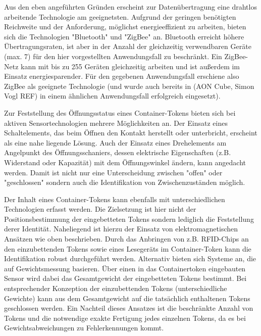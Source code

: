 Aus den eben angeführten Gründen erscheint zur Datenübertragung eine drahtlos arbeitende Technologie am geeignetsten. Aufgrund der geringen benötigten Reichweite und der Anforderung, möglichst energieeffizient zu arbeiten, bieten sich die Technologien "Bluetooth" und "ZigBee" an. Bluetooth erreicht höhere Übertragungsraten, ist aber in der Anzahl der gleichzeitig verwendbaren Geräte (max. 7) für den hier vorgestellten Anwendungsfall zu beschränkt. Ein ZigBee-Netz kann mit bis zu 255 Geräten gleichzeitig arbeiten und ist außerdem im Einsatz energiesparender. Für den gegebenen Anwendungsfall erschiene also ZigBee als geeignete Technologie (und wurde auch bereits in (AON Cube, Simon Vogl REF) in einem ähnlichen Anwendungsfall erfolgreich eingesetzt).

Zur Feststellung des Öffnungsstatus eines Container-Tokens bieten sich bei aktiven Sensortechnologien mehrere Möglichkeiten an. Der Einsatz eines Schaltelements, das beim Öffnen den Kontakt herstellt oder unterbricht, erscheint als eine nahe liegende Lösung. Auch der Einsatz eines Drehelements am Angelpunkt des Öffnungsschaniers, dessen elektrische Eigenschaften (z.B. Widerstand oder Kapazität) mit dem Öffnungswinkel ändern, kann angedacht werden. Damit ist nicht nur eine Unterscheidung zwischen "offen" oder "geschlossen" sondern auch die Identifikation von Zwischenzuständen möglich.

Der Inhalt eines Container-Tokens kann ebenfalls mit unterschiedlichen Technologien erfasst werden. Die Zielsetzung ist hier nicht der Positionsbestimmung der eingebetteten Tokens sondern lediglich die Feststellung derer Identität. Naheliegend ist hierzu der Einsatz von elektromagnetischen Ansätzen wie oben beschrieben. Durch das Anbringen von z.B. RFID-Chips an den einzubettenden Tokens sowie eines Lesegeräts im Container-Token kann die Identifikation robust durchgeführt werden. Alternativ bieten sich Systeme an, die auf Gewichtsmessung basieren. Über einen in das Containertoken eingebauten Sensor wird dabei das Gesamtgewicht der eingebetteten Tokens bestimmt. Bei entsprechender Konzeption der einzubettenden Tokens (unterschiedliche Gewichte) kann aus dem Gesamtgewicht auf die tatsächlich enthaltenen Tokens geschlossen werden. Ein Nachteil dieses Ansatzes ist die beschränkte Anzahl von Tokens und die notwendige exakte Fertigung jedes einzelnen Tokens, da es bei Gewichtsabweichungen zu Fehlerkennungen kommt.


